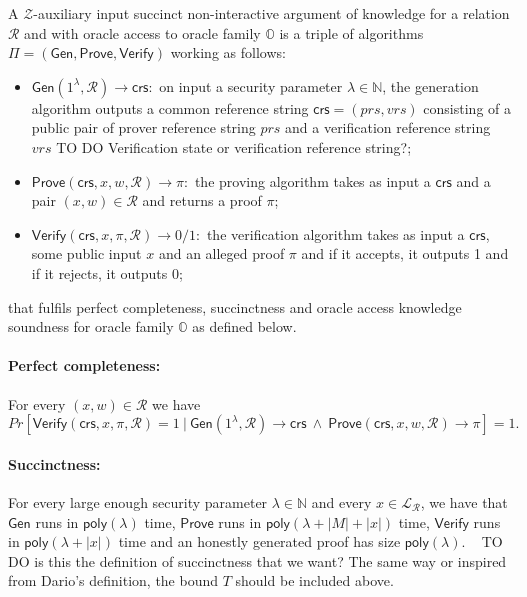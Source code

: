 \begin{definition}
\label{def:osnarks}
A $\mathcal{Z}$-auxiliary input succinct non-interactive argument of knowledge for a relation $\mathcal{R}$ and with oracle access to oracle family $\mathbb{O}$
is a triple of algorithms $\Pi=(\mathsf{Gen}, \mathsf{Prove}, \mathsf{Verify})$ working as follows:
\begin{itemize}
\item $\mathsf{Gen}(1^{\lambda},\mathcal{R}) \rightarrow \mathsf{crs}:$ 
on input a security parameter $\lambda \in \mathbb{N}$, the generation algorithm outputs
a common reference string $\mathsf{crs} = (\mathit{prs},\mathit{vrs})$ 
consisting of a public pair of prover reference string $\mathit{prs}$ and a verification reference string $\mathit{vrs}$ {\color{red} TO DO Verification state or verification reference string?};
\item $\mathsf{Prove}(\mathsf{crs}, x, w, \mathcal{R}) \rightarrow \pi:$ the proving algorithm takes as input 
a $\mathsf{crs}$ and a pair $(x,w) \in \mathcal{R}$ and returns a proof $\pi$;
\item $\mathsf{Verify}(\mathsf{crs}, x, \pi, \mathcal{R}) \rightarrow 0/1:$ the verification algorithm takes as input 
a $\mathsf{crs}$, some public input $x$ and an alleged proof $\pi$ and if it accepts, 
it outputs 1 and if it rejects, it outputs 0; 
\end{itemize}
\noindent that fulfils perfect completeness, succinctness and oracle access knowledge soundness for oracle family 
$\mathbb{O}$ as defined below.

\paragraph{Perfect completeness:} For every $(x,w) \in \mathcal{R}$ we have
$$\mathit{Pr}[ \mathsf{Verify}(\mathsf{crs}, x, \pi, \mathcal{R})=1 \  | \  \mathsf{Gen}(1^{\lambda},\mathcal{R}) \rightarrow \mathsf{crs} \ \wedge \  \mathsf{Prove}(\mathsf{crs}, x, w, \mathcal{R}) \rightarrow \pi ] = 1. $$

\paragraph{Succinctness:} For every large enough security parameter $\lambda \in \mathbb{N}$ 
and every $x \in \mathcal{L}_{\mathcal{R}}$, we have that 
$\mathsf{Gen}$ runs in $\mathsf{poly}(\lambda)$ time, $\mathsf{Prove}$ runs in $\mathsf{poly}(\lambda + |M|+ |x|)$ time,  
$\mathsf{Verify}$ runs in $\mathsf{poly}(\lambda + |x|)$ time and an honestly generated proof has size $\mathsf{poly}(\lambda)$. \
{\color{red} TO DO is this the definition of succinctness that we want? The same way or inspired from Dario's definition, the bound $T$ should be included above.}


\end{definition}
